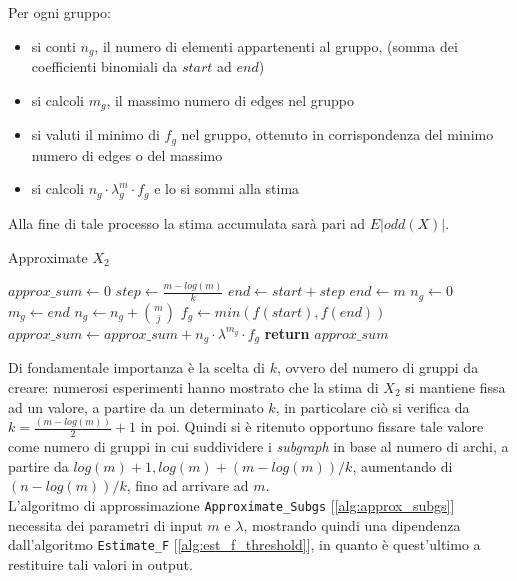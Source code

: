 Per ogni gruppo:
\begin{itemize}
	\item si conti $n_g$, il numero di elementi appartenenti al gruppo, (somma dei coefficienti binomiali da $start$ ad $end$)
	\item si calcoli $m_g$, il massimo numero di edges nel gruppo
	\item si valuti il minimo di $f_g$ nel gruppo, ottenuto in corrispondenza del minimo numero di edges o del massimo
	\item si calcoli $n_g \cdot \lambda^m_g \cdot f_g$ e lo si sommi alla stima
\end{itemize}
Alla fine di tale processo la stima accumulata sarà pari ad $E|odd(X)|$.\\
\begin{algorithm}
	\caption{Approximate $X_2$}
	\label{alg:approx_subgs}
	\begin{algorithmic}[1]
		\State $approx\_sum \gets 0$
		\State $step \gets \frac{m - log(m)}{k}$
				\State $end \gets start + step$
			\Else
				\State $end \gets m$
			\EndIf
			\State $n_g \gets 0$
			\State $m_g \gets end$
				\State $n_g \gets n_g + \binom{m}{j}$
			\EndFor
			\State $f_g \gets min(f(start), f(end))$
			\State $approx\_sum \gets approx\_sum + n_g \cdot \lambda^{m_g} \cdot f_g$
		\EndFor
		\State \textbf{return} $approx\_sum$
		\EndProcedure
	\end{algorithmic}
\end{algorithm}
Di fondamentale importanza è la scelta di $k$, ovvero del numero di gruppi da creare: numerosi esperimenti hanno mostrato che la stima di $X_2$ si mantiene fissa ad un valore, a partire da un determinato $k$, in particolare ciò si verifica da $k = \frac{(m - log(m))}{2} + 1$ in poi. Quindi si è ritenuto opportuno fissare tale valore come numero di gruppi in cui suddividere i \textit{subgraph} in base al numero di archi, a partire da $log(m) + 1, log(m) + (m-log(m))/k$, aumentando di $(n-log(m))/k$, fino ad arrivare ad $m$.\\
L'algoritmo di approssimazione \texttt{Approximate\_Subgs} [\ref{alg:approx_subgs}] necessita dei parametri di input $m$ e $\lambda$, mostrando quindi una dipendenza dall'algoritmo \texttt{Estimate\_F} [\ref{alg:est_f_threshold}], in quanto è quest'ultimo a restituire tali valori in output.\\
